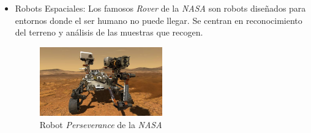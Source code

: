 \begin{itemize}
    \item Robots Espaciales: Los famosos \textit{Rover} de la \textit{NASA} son robots diseñados para entornos donde el ser humano no puede llegar. Se centran en reconocimiento del terreno y análisis de las muestras que recogen.
        \begin{figure}[H]
    \centering
    \includegraphics[width=0.5\textwidth]{img/perseverance.jpg}
    \caption{Robot \textit{Perseverance} de la \textit{NASA}} \label{fig:Perseverance}
    \end{figure}
\end{itemize}

